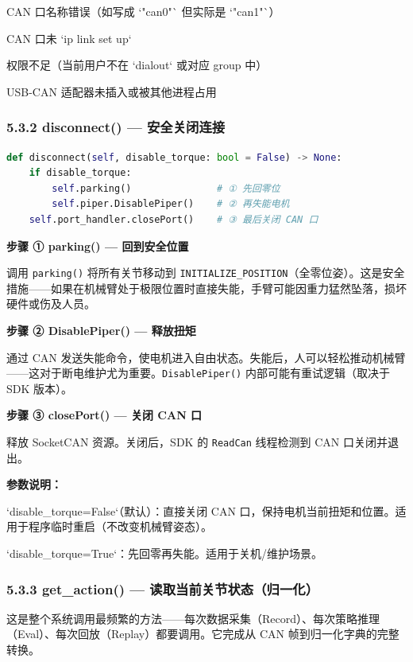 \documentclass[UTF8,a4paper,11pt]{ctexart}
\begin{document}
\item CAN 口名称错误（如写成 `"can0"` 但实际是 `"can1"`）
\item CAN 口未 `ip link set up`
\item 权限不足（当前用户不在 `dialout` 或对应 group 中）
\item USB-CAN 适配器未插入或被其他进程占用

\subsubsection{5.3.2 disconnect() — 安全关闭连接}

\begin{lstlisting}[language=python]
def disconnect(self, disable_torque: bool = False) -> None:
    if disable_torque:
        self.parking()               # ① 先回零位
        self.piper.DisablePiper()    # ② 再失能电机
    self.port_handler.closePort()    # ③ 最后关闭 CAN 口
\end{lstlisting}

\textbf{步骤 ① parking() — 回到安全位置}

调用 \texttt{parking()} 将所有关节移动到 \texttt{INITIALIZE_POSITION}（全零位姿）。这是安全措施——如果在机械臂处于极限位置时直接失能，手臂可能因重力猛然坠落，损坏硬件或伤及人员。

\textbf{步骤 ② DisablePiper() — 释放扭矩}

通过 CAN 发送失能命令，使电机进入自由状态。失能后，人可以轻松推动机械臂——这对于断电维护尤为重要。\texttt{DisablePiper()} 内部可能有重试逻辑（取决于 SDK 版本）。

\textbf{步骤 ③ closePort() — 关闭 CAN 口}

释放 SocketCAN 资源。关闭后，SDK 的 \texttt{ReadCan} 线程检测到 CAN 口关闭并退出。

\textbf{参数说明：}

\item `disable_torque=False`（默认）：直接关闭 CAN 口，保持电机当前扭矩和位置。适用于程序临时重启（不改变机械臂姿态）。
\item `disable_torque=True`：先回零再失能。适用于关机/维护场景。

\subsubsection{5.3.3 get_action() — 读取当前关节状态（归一化）}

这是整个系统调用最频繁的方法——每次数据采集（Record）、每次策略推理（Eval）、每次回放（Replay）都要调用。它完成从 CAN 帧到归一化字典的完整转换。
\end{document}
